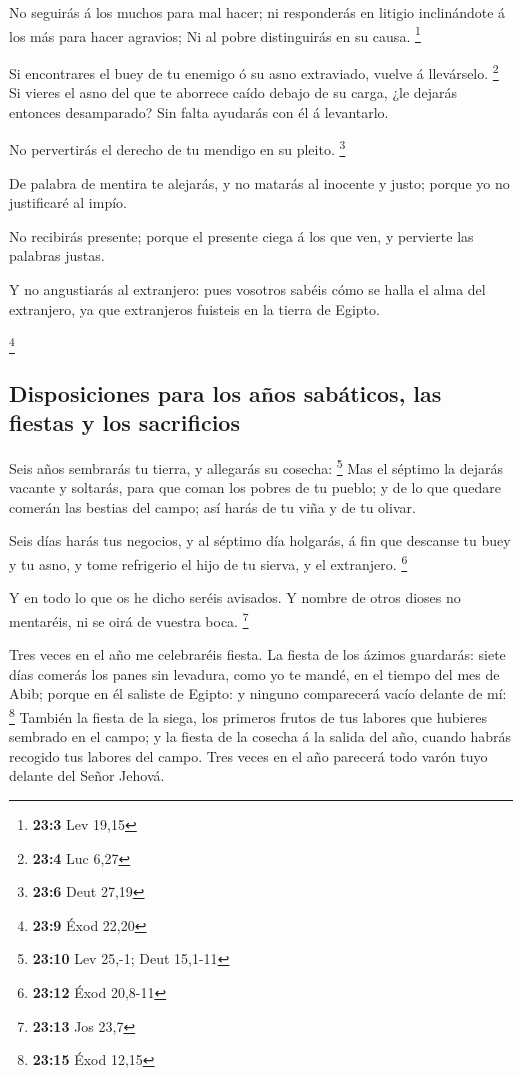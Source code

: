 No seguirás á los muchos para mal hacer; ni responderás en
litigio inclinándote á los más para hacer agravios;  Ni al
pobre distinguirás en su causa. \footnote{\textbf{23:3} Lev 19,15}

 Si encontrares el buey de tu enemigo ó su asno extraviado,
vuelve á llevárselo. \footnote{\textbf{23:4} Luc 6,27}  Si
vieres el asno del que te aborrece caído debajo de su carga, ¿le dejarás
entonces desamparado? Sin falta ayudarás con él á levantarlo.

 No pervertirás el derecho de tu mendigo en su pleito.
\footnote{\textbf{23:6} Deut 27,19}

 De palabra de mentira te alejarás, y no matarás al inocente
y justo; porque yo no justificaré al impío.

 No recibirás presente; porque el presente ciega á los que
ven, y pervierte las palabras justas.

 Y no angustiarás al extranjero: pues vosotros sabéis cómo
se halla el alma del extranjero, ya que extranjeros fuisteis en la
tierra de Egipto.

\footnote{\textbf{23:9} Éxod 22,20}

\hypertarget{disposiciones-para-los-auxf1os-sabuxe1ticos-las-fiestas-y-los-sacrificios}{%
\subsection{Disposiciones para los años sabáticos, las fiestas y los
sacrificios}\label{disposiciones-para-los-auxf1os-sabuxe1ticos-las-fiestas-y-los-sacrificios}}

 Seis años sembrarás tu tierra, y allegarás su cosecha:
\footnote{\textbf{23:10} Lev 25,-1; Deut 15,1-11}  Mas el
séptimo la dejarás vacante y soltarás, para que coman los pobres de tu
pueblo; y de lo que quedare comerán las bestias del campo; así harás de
tu viña y de tu olivar.

 Seis días harás tus negocios, y al séptimo día holgarás, á
fin que descanse tu buey y tu asno, y tome refrigerio el hijo de tu
sierva, y el extranjero. \footnote{\textbf{23:12} Éxod 20,8-11}

 Y en todo lo que os he dicho seréis avisados. Y nombre de
otros dioses no mentaréis, ni se oirá de vuestra boca. \footnote{\textbf{23:13}
  Jos 23,7}

 Tres veces en el año me celebraréis fiesta. 
La fiesta de los ázimos guardarás: siete días comerás los panes sin
levadura, como yo te mandé, en el tiempo del mes de Abib; porque en él
saliste de Egipto: y ninguno comparecerá vacío delante de mí:
\footnote{\textbf{23:15} Éxod 12,15}  También la fiesta de
la siega, los primeros frutos de tus labores que hubieres sembrado en el
campo; y la fiesta de la cosecha á la salida del año, cuando habrás
recogido tus labores del campo.  Tres veces en el año
parecerá todo varón tuyo delante del Señor Jehová.


